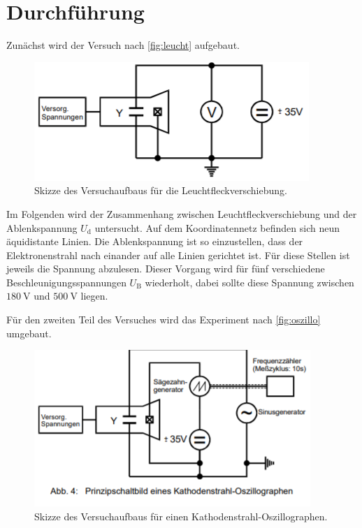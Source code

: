 \section{Durchführung}
\label{sec:Durchführung}


Zunächst wird der Versuch nach \autoref{fig:leucht} aufgebaut.

\begin{figure}
    \centering
    \includegraphics[width=\textwidth]{images/bild3.png}
    \caption{Skizze des Versuchaufbaus für die Leuchtfleckverschiebung.}
    \label{fig:leucht}
\end{figure}

Im Folgenden wird der Zusammenhang zwischen Leuchtfleckverschiebung und der Ablenkspannung $U_\text{d}$ untersucht.
Auf dem Koordinatennetz befinden sich neun äquidistante Linien.
Die Ablenkspannung ist so einzustellen, dass der Elektronenstrahl nach einander auf alle Linien gerichtet ist.
Für diese Stellen ist jeweils die Spannung abzulesen.
Dieser Vorgang wird für fünf verschiedene Beschleunigungsspannungen $U_\text{B}$ wiederholt, dabei sollte diese Spannung zwischen $\SI{180}{\volt}$ und $\SI{500}{\volt}$ liegen.

Für den zweiten Teil des Versuches wird das Experiment nach \autoref{fig:oszillo} umgebaut.

\begin{figure}
    \centering
    \includegraphics[width=\textwidth]{images/bild4.png}
    \caption{Skizze des Versuchaufbaus für einen Kathodenstrahl-Oszillographen.}
    \label{fig:oszillo}
\end{figure}

